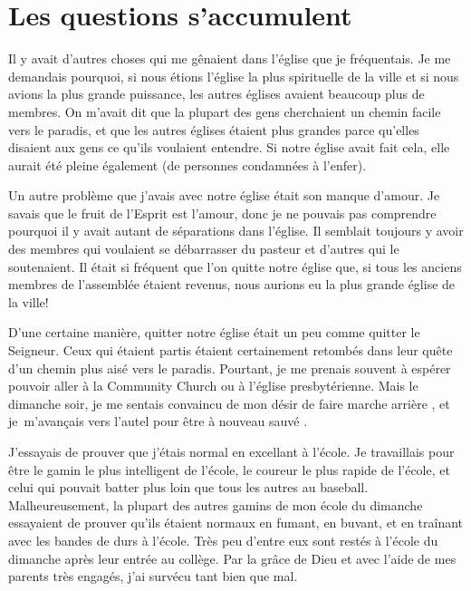 \section{Les questions s'accumulent}

Il y avait d'autres choses qui me gênaient dans l'église que je
 fréquentais. Je me demandais pourquoi, si nous étions l'église la plus
 spirituelle de la ville et si nous avions la plus grande puissance, les autres
 églises avaient beaucoup plus de membres. On m'avait dit que la plupart des
 gens cherchaient un chemin facile vers le paradis, et que les autres églises
 étaient plus grandes parce qu'elles disaient aux gens ce qu'ils voulaient
 entendre. Si notre église avait fait cela, elle aurait été pleine également
 (de personnes condamnées à l'enfer).

Un autre problème que j'avais avec notre église était son manque d'amour. Je
 savais que le fruit de l'Esprit est l'amour,
 donc je ne pouvais pas comprendre
 pourquoi il y avait autant de séparations dans l'église. Il semblait
 toujours y avoir des membres qui voulaient se débarrasser du pasteur et
 d'autres qui le soutenaient. Il était si fréquent que l'on quitte notre église que,
 si tous les anciens membres de l'assemblée étaient revenus, nous aurions eu la
 plus grande église de la ville!

D'une certaine manière, quitter notre église était un peu comme quitter le
 Seigneur. Ceux qui étaient partis étaient certainement retombés dans leur quête
 d'un chemin plus aisé vers le paradis. Pourtant, je me prenais souvent à
 espérer pouvoir aller à la Community Church ou à l'église presbytérienne. Mais
 le dimanche soir, je me sentais convaincu de mon désir de \Og faire marche
 arrière \Fg{}, et je~m'avançais vers l'autel pour être à nouveau
 \Og sauvé \Fg{}.

J'essayais de prouver que j'étais normal en excellant à l'école. Je travaillais
 pour être le gamin le plus intelligent de l'école, le coureur le plus rapide de
 l'école, et celui qui pouvait batter plus loin que tous les autres au baseball.
 Malheureusement, la plupart des autres gamins de mon école du dimanche
 essayaient de prouver qu'ils étaient normaux en fumant, en buvant, et en
 traînant avec les bandes de durs à l'école. Très peu d'entre eux sont restés à
 l'école du dimanche après leur entrée au collège. Par la grâce de Dieu et avec
 l'aide de mes parents très engagés, j'ai survécu tant bien que mal.

